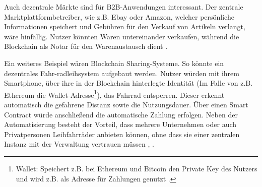 Auch dezentrale Märkte sind für B2B-Anwendungen interessant. Der zentrale Marktplattformbetreiber, wie z.B. Ebay oder Amazon, welcher persönliche Informationen speichert und Gebühren für den Verkauf von Artikeln verlangt, wäre hinfällig. Nutzer könnten Waren untereinander verkaufen, während die Blockchain als Notar für den Warenaustausch dient \cite{BenHamidaBlockchainEnterpriseOverview2017}.

Ein weiteres Beispiel wären Blockchain Sharing-Systeme. So könnte ein dezentrales Fahr-radleihsystem aufgebaut werden. Nutzer würden mit ihrem Smartphone, über ihre in der Blockchain hinterlegte Identität (Im Falle von z.B. Ethereum die Wallet-Adresse\footnote{Wallet: Speichert z.B. bei Ethereum und Bitcoin den Private Key des Nutzers und wird z.B. als Adresse für Zahlungen genutzt \cite{AntonopoulosMasteringbitcoin2015}.}), das Fahrrad entsperren. Dieser erkennt automatisch die gefahrene Distanz sowie die Nutzungsdauer. Über einen Smart Contract würde anschließend die automatische Zahlung erfolgen. Neben der Automatisierung besteht der Vorteil, dass mehrere Unternehmen oder auch Privatpersonen Leihfahrräder anbieten können, ohne dass sie einer zentralen Instanz mit der Verwaltung vertrauen müssen \cite{FutureFluxFestivalBlockchainBikes}, \cite{FischerIoTBlockchain}.
